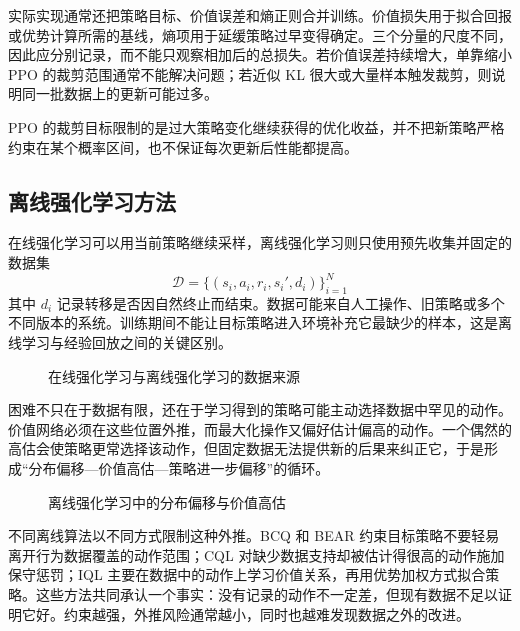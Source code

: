 实际实现通常还把策略目标、价值误差和熵正则合并训练。价值损失用于拟合回报或优势计算所需的基线，熵项用于延缓策略过早变得确定。三个分量的尺度不同，因此应分别记录，而不能只观察相加后的总损失。若价值误差持续增大，单靠缩小 PPO 的裁剪范围通常不能解决问题；若近似 KL 很大或大量样本触发裁剪，则说明同一批数据上的更新可能过多。

\begin{importantnote}
  PPO 的裁剪目标限制的是过大策略变化继续获得的优化收益，并不把新策略严格约束在某个概率区间，也不保证每次更新后性能都提高。
\end{importantnote}

\subsection{离线强化学习方法}

在线强化学习可以用当前策略继续采样，离线强化学习则只使用预先收集并固定的数据集
\begin{equation}
\mathcal D=\{(s_i,a_i,r_i,s_i',d_i)\}_{i=1}^{N}
\end{equation}
其中 $d_i$ 记录转移是否因自然终止而结束。数据可能来自人工操作、旧策略或多个不同版本的系统。训练期间不能让目标策略进入环境补充它最缺少的样本，这是离线学习与经验回放之间的关键区别。

\begin{figure}[htbp]
  \centering
  \resizebox{0.92\linewidth}{!}{
    
  }
  \caption{在线强化学习与离线强化学习的数据来源}
  \label{fig:online_offline_rl}
\end{figure}

困难不只在于数据有限，还在于学习得到的策略可能主动选择数据中罕见的动作。价值网络必须在这些位置外推，而最大化操作又偏好估计偏高的动作。一个偶然的高估会使策略更常选择该动作，但固定数据无法提供新的后果来纠正它，于是形成“分布偏移—价值高估—策略进一步偏移”的循环。

\begin{figure}[htbp]
  \centering
  \resizebox{0.92\linewidth}{!}{
    
  }
  \caption{离线强化学习中的分布偏移与价值高估}
  \label{fig:offline_rl_distribution_shift}
\end{figure}

不同离线算法以不同方式限制这种外推。BCQ 和 BEAR 约束目标策略不要轻易离开行为数据覆盖的动作范围；CQL 对缺少数据支持却被估计得很高的动作施加保守惩罚；IQL 主要在数据中的动作上学习价值关系，再用优势加权方式拟合策略。这些方法共同承认一个事实：没有记录的动作不一定差，但现有数据不足以证明它好。约束越强，外推风险通常越小，同时也越难发现数据之外的改进。

